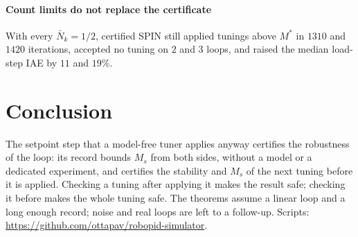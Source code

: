 \documentclass[letterpaper, 10 pt, conference]{ieeeconf}
\newcommand{\spin}{SPIN\xspace}
\begin{document}
\paragraph*{Count limits do not replace the certificate} With every
$\bar N_k=1/2$, certified \spin still applied tunings above $M^*$ in
$1310$ and $1420$ iterations, accepted no tuning on $2$ and $3$ loops,
and raised the median load-step IAE by $11$ and $19\%$.

\section{Conclusion}

The setpoint step that a model-free tuner applies anyway certifies the
robustness of the loop: its record bounds $M_s$ from both sides, without
a model or a dedicated experiment, and certifies the stability and $M_s$
of the next tuning before it is applied. Checking a tuning after
applying it makes the result safe; checking it before makes the whole
tuning safe. The theorems assume a
linear loop and a long enough record; noise and real loops are left to
a follow-up.
Scripts: \url{https://github.com/ottapav/robopid-simulator}.
\end{document}
